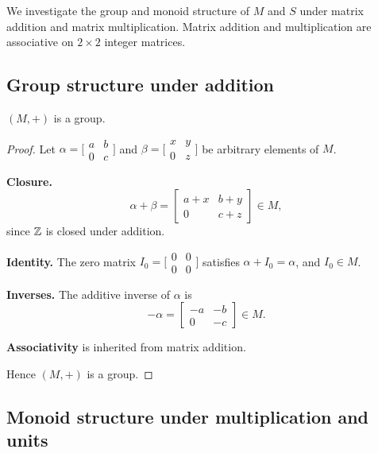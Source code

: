 We investigate the group and monoid structure of $M$ and $S$ under matrix
addition and matrix multiplication. Matrix addition and multiplication are
associative on $2\times 2$ integer matrices.

\subsection{Group structure under addition}

\begin{proposition}
$(M, +)$ is a group.
\end{proposition}
\begin{proof}
Let $\alpha = \bigl[\begin{smallmatrix}a&b\\0&c\end{smallmatrix}\bigr]$ and
$\beta = \bigl[\begin{smallmatrix}x&y\\0&z\end{smallmatrix}\bigr]$ be arbitrary
elements of $M$.

\textbf{Closure.}
\[
    \alpha + \beta
    = \begin{bmatrix} a+x & b+y \\ 0 & c+z \end{bmatrix} \in M,
\]
since $\mathbb{Z}$ is closed under addition.

\textbf{Identity.}
The zero matrix $I_0 = \bigl[\begin{smallmatrix}0&0\\0&0\end{smallmatrix}\bigr]$
satisfies $\alpha + I_0 = \alpha$, and $I_0 \in M$.

\textbf{Inverses.}
The additive inverse of $\alpha$ is
\[
    -\alpha = \begin{bmatrix} -a & -b \\ 0 & -c \end{bmatrix} \in M.
\]

\textbf{Associativity} is inherited from matrix addition.

Hence $(M, +)$ is a group.
\end{proof}

\subsection{Monoid structure under multiplication and units}

